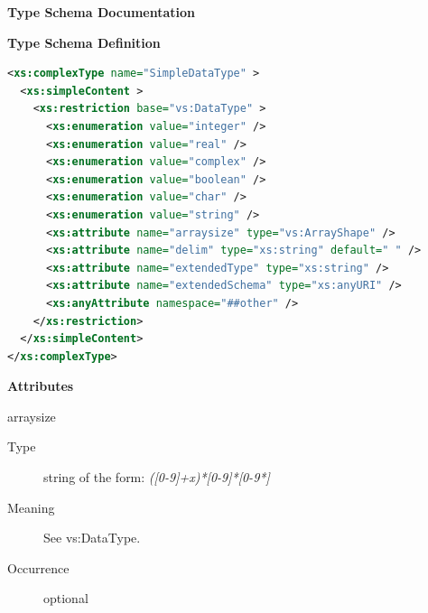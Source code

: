 \documentclass[11pt,a4paper]{ivoa}
\begin{document}
\begin{generated}
\begingroup
        \renewcommand*\descriptionlabel[1]{%
        \hbox to 5.5em{\emph{#1}\hfil}}\vspace{2ex}\noindent\textbf{ Type Schema Documentation}



\vspace{1ex}\noindent\textbf{ Type Schema Definition}

\begin{lstlisting}[language=XML,basicstyle=\footnotesize]
<xs:complexType name="SimpleDataType" >
  <xs:simpleContent >
    <xs:restriction base="vs:DataType" >
      <xs:enumeration value="integer" />
      <xs:enumeration value="real" />
      <xs:enumeration value="complex" />
      <xs:enumeration value="boolean" />
      <xs:enumeration value="char" />
      <xs:enumeration value="string" />
      <xs:attribute name="arraysize" type="vs:ArrayShape" />
      <xs:attribute name="delim" type="xs:string" default=" " />
      <xs:attribute name="extendedType" type="xs:string" />
      <xs:attribute name="extendedSchema" type="xs:anyURI" />
      <xs:anyAttribute namespace="##other" />
    </xs:restriction>
  </xs:simpleContent>
</xs:complexType>
\end{lstlisting}

\vspace{0.5ex}\noindent\textbf{ Attributes}

\begingroup\small\begin{bigdescription}
\item[arraysize]
\begin{description}
\item[Type] string of the form: \emph{([0-9]+x)*[0-9]*[0-9*]}
\item[Meaning] See vs:DataType.
\item[Occurrence] optional


\end{description}
\end{bigdescription}
\end{generated}
\end{document}
